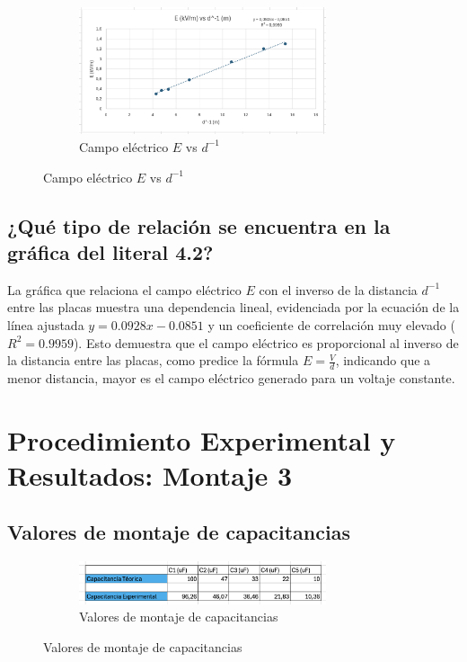\begin{figure}[H]
    \centering
    \begin{subfigure}[b]{\textwidth}
        \centering
        \includegraphics[width=0.8\textwidth]{Figures/1. Content/campoVSd1.png}
        \caption{Campo eléctrico $E$ vs $d^{-1}$}
        \label{fig: Campo vs d^-2}
    \end{subfigure}
    \hfill
\end{figure}

\subsection{¿Qué tipo de relación se encuentra en la gráfica del literal 4.2?}
La gráfica que relaciona el campo eléctrico \( E \) con el inverso de la distancia \( d^{-1} \) entre las placas muestra una dependencia lineal, evidenciada por la ecuación de la línea ajustada \( y = 0.0928x - 0.0851 \) y un coeficiente de correlación muy elevado (\( R^2 = 0.9959 \)). Esto demuestra que el campo eléctrico es proporcional al inverso de la distancia entre las placas, como predice la fórmula \( E = \frac{V}{d} \), indicando que a menor distancia, mayor es el campo eléctrico generado para un voltaje constante.

\section{Procedimiento Experimental y Resultados: Montaje 3}

\subsection{Valores de montaje de capacitancias}

\begin{figure}[H]
    \centering
    \begin{subfigure}[b]{\textwidth}
        \centering
        \includegraphics[width=0.8\textwidth]{Figures/1. Content/MontajeCapacitancias.png}
        \caption{Valores de montaje de capacitancias}
        \label{fig: Valores de montaje de capacitancias}
    \end{subfigure}
    \hfill
\end{figure}


